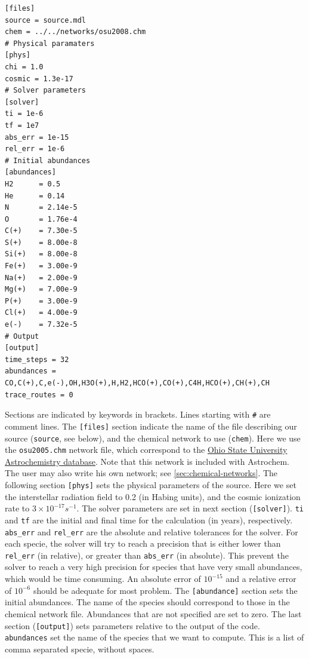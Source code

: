\documentclass[a4paper,12pt]{article}
\begin{document}
{\begin{verbatim}
[files]
source = source.mdl
chem = ../../networks/osu2008.chm
# Physical paramaters
[phys]
chi = 1.0
cosmic = 1.3e-17
# Solver parameters
[solver]
ti = 1e-6
tf = 1e7
abs_err = 1e-15
rel_err = 1e-6
# Initial abundances
[abundances]
H2      = 0.5
He      = 0.14
N       = 2.14e-5
O       = 1.76e-4
C(+)    = 7.30e-5
S(+)    = 8.00e-8
Si(+)   = 8.00e-8
Fe(+)   = 3.00e-9
Na(+)   = 2.00e-9
Mg(+)   = 7.00e-9
P(+)    = 3.00e-9
Cl(+)   = 4.00e-9
e(-)    = 7.32e-5
# Output
[output]
time_steps = 32
abundances = CO,C(+),C,e(-),OH,H3O(+),H,H2,HCO(+),CO(+),C4H,HCO(+),CH(+),CH
trace_routes = 0
\end{verbatim}

\noindent
Sections are indicated by keywords in brackets. Lines starting with
\verb=#= are comment lines. The \verb=[files]= section indicate the
name of the file describing our source (\verb=source=, see below), and
the chemical network to use (\verb=chem=). Here we use the
\verb=osu2005.chm= network file, which correspond to the \href{
  http://www.physics.ohio-state.edu/~eric/research.html}{Ohio State
  University Astrochemistry database}. Note that this network is
included with Astrochem. The user may also write his own network; see
\ref{sec:chemical-networks}. The following section \verb=[phys]= sets
the physical parameters of the source. Here we set the interstellar
radiation field to 0.2 (in Habing units), and the cosmic ionization
rate to $3 \times 10^{-17} s^{-1}$. The solver parameters are set in
next section (\verb=[solver]=). \verb=ti= and \verb=tf= are the
initial and final time for the calculation (in years),
respectively. \verb=abs_err= and \verb=rel_err= are the absolute and
relative tolerances for the solver. For each specie, the solver will
try to reach a precision that is either lower than \verb=rel_err= (in
relative), or greater than \verb=abs_err= (in absolute). This prevent
the solver to reach a very high precision for species that have very
small abundances, which would be time consuming. An absolute error of
$10^{-15}$ and a relative error of $10^{-6}$ should be adequate for
most problem. The \verb=[abundance]= section sets the initial
abundances. The name of the species should correspond to those in the
chemical network file. Abundances that are not specified are set to
zero. The last section (\verb=[output]=) sets parameters relative to
the output of the code. \verb=abundances= set the name of the species
that we want to compute. This is a list of comma separated specie,
without spaces.

}
\end{document}
